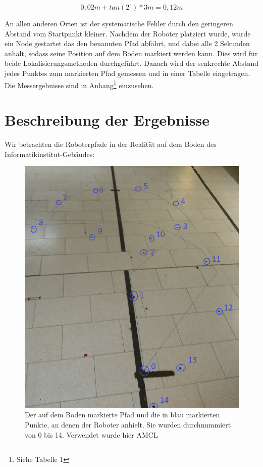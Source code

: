 \documentclass[11pt,a4paper]{article}
\begin{document}
\begin{equation*}
  0,02m + tan(2^\circ) * 3m = 0,12m
\end{equation*}

An allen anderen Orten ist der systematische Fehler durch den geringeren Abstand vom Startpunkt kleiner.
Nachdem der Roboter platziert wurde, wurde ein Node gestartet das den benannten Pfad abfährt, und dabei alle 2 Sekunden anhält, sodass seine Position 
auf dem Boden markiert werden kann. Dies wird für beide Lokalisierungsmethoden durchgeführt. Danach wird der senkrechte Abstand jedes Punktes 
zum markierten Pfad gemessen und in einer Tabelle eingetragen. Die Messergebnisse sind in Anhang\footnote{Siehe Tabelle 1} einzusehen.

\section{Beschreibung der Ergebnisse}

Wir betrachten die Roboterpfade in der Realität auf dem Boden des Informatikinstitut-Gebäudes:

\begin{figure}[ht]
  \centering
  \includegraphics[scale = 0.9]{pfadAMCL.png}
  \caption{Der auf dem Boden markierte Pfad und die in blau markierten Punkte, an denen der Roboter anhielt. Sie wurden durchnummiert von 0 bis 14.
   Verwendet wurde hier AMCL}
  \label{fig: pfadAMCL}
  \end{figure}
\end{document}
